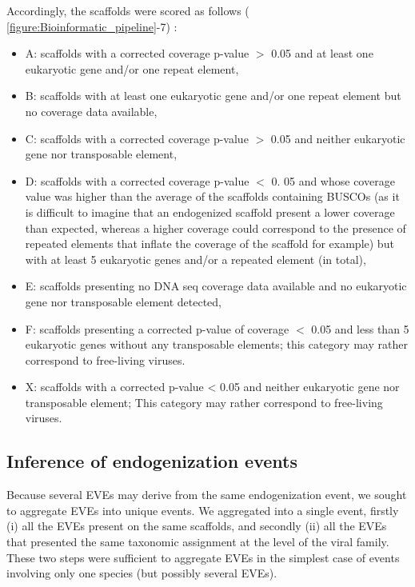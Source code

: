 Accordingly, the scaffolds were scored as follows (\figurename{ \ref{figure:Bioinformatic_pipeline}}-7) : 
\begin{itemize}
    \item A: scaffolds with a corrected coverage p-value $>$ 0.05 and at least one eukaryotic gene and/or one repeat element, 
    \item B: scaffolds with at least one eukaryotic gene and/or one repeat element but no coverage data available, 
    \item C: scaffolds with a corrected coverage p-value $>$ 0.05 and neither eukaryotic gene nor transposable element, 
    \item D: scaffolds with a corrected coverage p-value $<$ 0. 05 and whose coverage value was higher than the average of the scaffolds containing BUSCOs (as it is difficult to imagine that an endogenized scaffold present a lower coverage than expected, whereas a higher coverage could correspond to the presence of repeated elements that inflate the coverage of the scaffold for example) but with at least 5 eukaryotic genes and/or a repeated element (in total), 
    \item E: scaffolds presenting no DNA seq coverage data available and no eukaryotic gene nor transposable element detected, 
    \item F: scaffolds presenting a corrected p-value of coverage $<$ 0.05 and less than 5 eukaryotic genes without any transposable elements; this category may rather correspond to free-living viruses.
    \item X: scaffolds with a corrected p-value < 0.05 and neither eukaryotic gene nor transposable element; This category may rather correspond to free-living viruses.
\end{itemize}


\subsection{Inference of endogenization events}
\label{sec:MM-6}

Because several EVEs may derive from the same endogenization event, we sought to aggregate EVEs into unique events. We aggregated into a single event, firstly (i) all the EVEs present on the same scaffolds, and secondly (ii) all the EVEs that presented the same taxonomic assignment at the level of the viral family.  These two steps were sufficient to aggregate EVEs in the simplest case of events involving only one species (but possibly several EVEs).  

